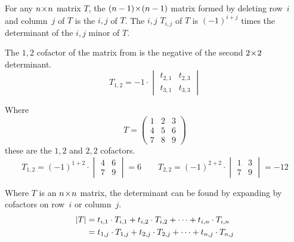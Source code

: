 \begin{definition}
For any \( n \! \times \! n \) matrix \( T \), the \( (n-1) \! \times \! (n-1) \) matrix formed by
deleting row~\( i \) and column~\( j \) of \( T \) is the
\( i,j \) %
of \( T \).
The \( i,j \) %
\( T_{i,j} \) of \( T \) is
\( (-1)^{i+j} \) times the determinant of the \( i,j \) minor of \( T \).
\end{definition}

\begin{example}
The $1,2$ cofactor of the matrix from 
is the negative of the second $2 \! \times \! 2$ determinant.
\begin{equation*}
  T_{1,2}=
  -1\cdot\begin{vmatrix}
    t_{2,1}  &t_{2,3}  \\
    t_{3,1}  &t_{3,3}
  \end{vmatrix}
\end{equation*}
\end{example}

\begin{example}
Where
\begin{equation*}
   T=
   \begin{pmatrix}
      1  &2  &3  \\
      4  &5  &6  \\
      7  &8  &9
   \end{pmatrix}
\end{equation*}
these are the  \( 1,2 \) and \( 2,2 \) cofactors.
\begin{equation*}
   T_{1,2}=
   (-1)^{1+2}\cdot\begin{vmatrix}
                4  &6  \\
                7  &9
             \end{vmatrix}=6
  \qquad
   T_{2,2}=
   (-1)^{2+2}\cdot\begin{vmatrix}
                1  &3  \\
                7  &9
             \end{vmatrix}=-12
\end{equation*}
\end{example}

\begin{theorem}
\label{th:LaPlaceExp}
%
Where \( T \) is an \( n \! \times \! n \) matrix,
the determinant can be found by expanding by cofactors on
row~$i$ or column~$j$.
\begin{align*}
   \deter{T}
   &=t_{i,1}\cdot T_{i,1}+t_{i,2}\cdot T_{i,2}+\cdots+t_{i,n}\cdot T_{i,n}  \\
   &=t_{1,j}\cdot T_{1,j}+t_{2,j}\cdot T_{2,j}+\cdots+t_{n,j}\cdot T_{n,j}
\end{align*}
\end{theorem}

